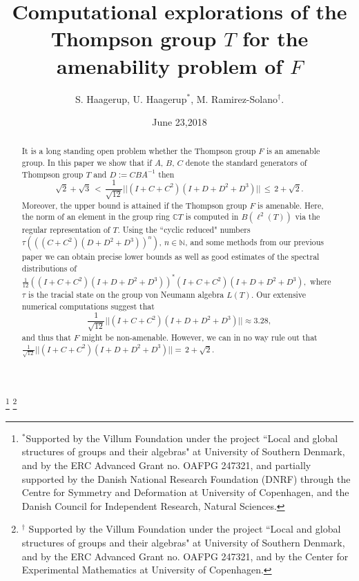\documentclass{amsart}
\newcommand{\C}{\mathbb C}
\newcommand{\N}{\mathbb N}
\theoremstyle{definition}
\begin{document}
\title[Computational explorations of $T$ for the amenability problem of $F$]
 {Computational explorations of the Thompson group $T$ for the amenability problem of $F$}


\author[ S.~Haagerup~U.~Haagerup~M.~Ramirez-Solano ]{S. Haagerup, U. Haagerup$^*$, M. Ramirez-Solano$^\dag$.}
\date{June 23,2018}%



\thanks{$^*$Supported by the Villum Foundation under the project ``Local and global structures of groups and their algebras" at University of Southern Denmark, and by the ERC Advanced Grant no. OAFPG 247321, and partially supported by the Danish National Research Foundation (DNRF) through the Centre for Symmetry and Deformation at University of Copenhagen, and the Danish Council for Independent Research, Natural Sciences.}
\thanks{$^\dag$ Supported by the Villum Foundation under the project ``Local and global structures of groups and their algebras" at University of Southern Denmark, and by the ERC Advanced Grant no. OAFPG 247321, and by the Center for Experimental Mathematics at University of Copenhagen.}

\begin{abstract}
It is a long standing open problem whether the Thompson group $F$ is an amenable group.
In this paper we show that if $A$, $B$, $C$ denote the standard generators of Thompson group $T$ and  $D:=C B A^{-1}$ then
$$\sqrt2+\sqrt3\,<\,\frac1{\sqrt{12}}||(I+C+C^2)(I+D+D^2+D^3)||\,\le\, 2+\sqrt2.$$
Moreover, the upper bound is attained if the Thompson group $F$ is amenable.
Here, the norm of an element in the group ring $\C T$ is computed in $B(\ell^2(T))$ via the regular representation of $T$. 
Using the ``cyclic reduced" numbers $\tau(((C+C^2)(D+D^2+D^3))^n)$, $n\in\N$, and some methods from our previous paper \cite{HaagerupRamirezSolano} we can obtain precise lower bounds as well as good estimates of the spectral distributions of $\frac1{12}((I+C+C^2)(I+D+D^2+D^3))^*(I+C+C^2)(I+D+D^2+D^3),$ where   $\tau$ is the tracial state on the group von Neumann algebra $L(T)$.
Our extensive numerical computations suggest that 
$$\frac{1}{\sqrt{12}}||(I+C+C^2)(I+D+D^2+D^3)||\approx 3.28,$$
and thus that $F$ might be non-amenable.
However, we can in no way rule out that $\frac1{\sqrt{12}}||(I+C+C^2)(I+D+D^2+D^3)||=\, 2+\sqrt2$.
\end{abstract}
\end{document}
